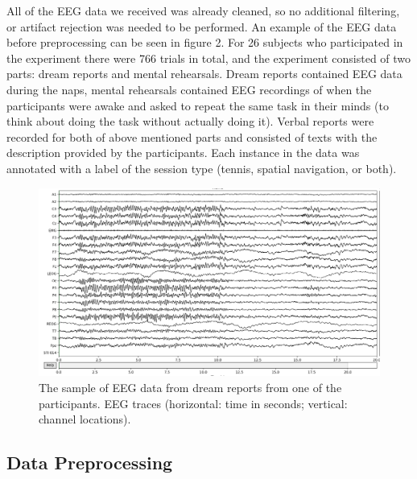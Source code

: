 \documentclass{article}
\begin{document}
All of the EEG data we received was already cleaned, so no additional filtering, or artifact rejection was needed to be performed. An example of the EEG data before preprocessing can be seen in figure 2.  For 26 subjects who participated in the experiment there were 766 trials in total, and the experiment consisted of two parts: dream reports and mental rehearsals. Dream reports contained EEG data during the naps, mental rehearsals contained EEG recordings of when the participants were awake and asked to repeat the same task in their minds (to think about doing the task without actually doing it). Verbal reports were recorded for both of above mentioned parts and consisted of texts with the description provided by the participants. Each instance in the data was annotated with a label of the session type (tennis, spatial navigation, or both).
\begin{figure}[!ht]
	\centering
	\includegraphics[scale=0.2]{eeg_ex}
	\caption{The sample of EEG data from dream reports from one of the participants. EEG traces (horizontal: time in seconds; vertical: channel locations).}
\end{figure} 

\subsection{Data Preprocessing}
\end{document}
